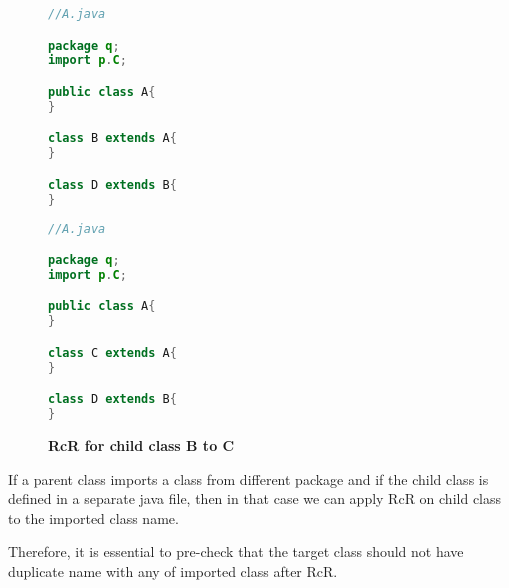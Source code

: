 \begin{figure}[th]
\centering
\begin{minipage}[t]{0.45\linewidth}
\begin{lstlisting}[language=java, basicstyle=\scriptsize\ttfamily,frame=single]	
//A.java

package q;
import p.C;

public class A{	
}

class B extends A{	
}

class D extends B{
}
\end{lstlisting}
\end{minipage}
\hfill
\begin{minipage}[t]{0.45\linewidth}
\begin{lstlisting}[language=java, basicstyle=\scriptsize\ttfamily,frame=single]
//A.java

package q;
import p.C;

public class A{	
}

class C extends A{	
}

class D extends B{
}	
\end{lstlisting}
\end{minipage}
\caption{\textbf{RcR for child class B to C}}
\label{figure:figpc3_1}
\end{figure}

If a parent class imports a class from different package and if the child class is defined in a separate java file, then in that case we can apply RcR on child class to the imported class name.

Therefore, it is essential to pre-check that the target class should not have duplicate name with any of imported class after RcR.

